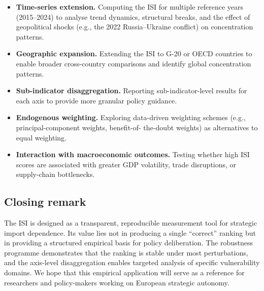 \begin{itemize}[leftmargin=2em]
  \item \textbf{Time-series extension.}  Computing the ISI for
    multiple reference years (2015--2024) to analyse trend dynamics,
    structural breaks, and the effect of geopolitical shocks (e.g.,
    the 2022 Russia--Ukraine conflict) on concentration patterns.

  \item \textbf{Geographic expansion.}  Extending the ISI to G-20
    or OECD countries to enable broader cross-country comparisons
    and identify global concentration patterns.

  \item \textbf{Sub-indicator disaggregation.}  Reporting
    sub-indicator-level results for each axis to provide more
    granular policy guidance.

  \item \textbf{Endogenous weighting.}  Exploring data-driven
    weighting schemes (e.g., principal-component weights, benefit-of-
    the-doubt weights) as alternatives to equal weighting.

  \item \textbf{Interaction with macroeconomic outcomes.}  Testing
    whether high ISI scores are associated with greater GDP
    volatility, trade disruptions, or supply-chain bottlenecks.
\end{itemize}

\subsection{Closing remark}

The ISI is designed as a transparent, reproducible measurement tool
for strategic import dependence.  Its value lies not in producing a
single ``correct'' ranking but in providing a structured empirical
basis for policy deliberation.  The robustness programme demonstrates
that the ranking is stable under most perturbations, and the
axis-level disaggregation enables targeted analysis of specific
vulnerability domains.  We hope that this empirical application will
serve as a reference for researchers and policy-makers working on
European strategic autonomy.
